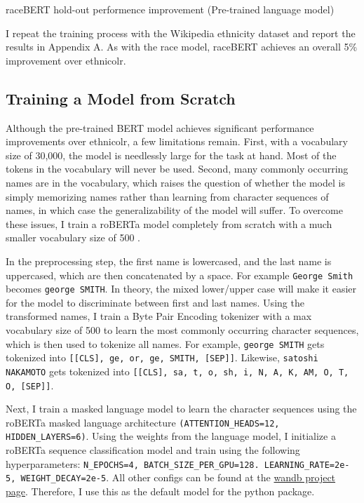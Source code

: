 \documentclass[11pt]{article}
\begin{document}
\begin{table}[H]
 \centering
 
 \caption{raceBERT hold-out performence improvement (Pre-trained language model)}
 \label{tab:pretrained_race_model_performance_comparison}
\end{table}

I repeat the training process with the Wikipedia ethnicity dataset \parencite{ambekar_name-ethnicity_2009,sood_predicting_2018} and report the results in Appendix A. 
As with the race model, raceBERT achieves an overall 5\% improvement over ethnicolr. 

\subsection{Training a Model from Scratch}

Although the pre-trained BERT model achieves significant performance improvements over ethnicolr, a few limitations remain.
First, with a vocabulary size of 30,000, the model is needlessly large for the task at hand. 
Most of the tokens in the vocabulary will never be used.
Second, many commonly occurring names are in the vocabulary, which raises the question of whether the model is simply memorizing names rather than learning from character sequences of names, in which case the generalizability of the model will suffer. 
To overcome these issues, I train a roBERTa model completely from scratch with a much smaller vocabulary size of 500 \parencite{liu_roberta_2019}. 

In the preprocessing step, the first name is lowercased, and the last name is uppercased, which are then concatenated by a space.
For example \texttt{George Smith} becomes \texttt{george SMITH}. 
In theory, the mixed lower/upper case will make it easier for the model to discriminate between first and last names.
Using the transformed names, I train a Byte Pair Encoding tokenizer with a max vocabulary size of 500 to learn the most commonly occurring character sequences, which is then used to tokenize all names.
For example, \texttt{george SMITH} gets tokenized into \texttt{[[CLS], ge, or, ge, SMITH, [SEP]]}.
Likewise, \texttt{satoshi NAKAMOTO} gets tokenized into \texttt{[[CLS], sa, t, o, sh, i, N, A, K, AM, O, T, O, [SEP]]}.

Next, I train a masked language model to learn the character sequences using the roBERTa masked language architecture \texttt{(ATTENTION\_HEADS=12, HIDDEN\_LAYERS=6)}. 
Using the weights from the language model, I initialize a roBERTa sequence classification model and train using the following hyperparameters: \texttt{N\_EPOCHS=4, BATCH\_SIZE\_PER\_GPU=128. LEARNING\_RATE=2e-5, WEIGHT\_DECAY=2e-5}.
All other configs can be found at the \href{https://wandb.ai/parasu/raceBERT-public/runs/39jr1hrc/overview}{wandb project page}.
Therefore, I use this as the default model for the python package.
\end{document}
